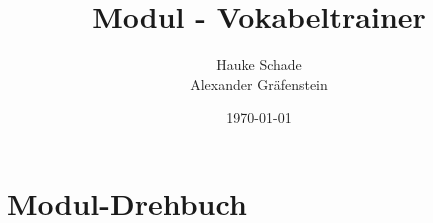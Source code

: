 \documentclass[a4paper]{scrartcl}
\title{Modul - Vokabeltrainer}
\author{Hauke Schade\\Alexander Gräfenstein}
\date{\today}
\begin{document}
	\maketitle
	\newpage

	

	\section{Modul-Drehbuch}
	
\end{document}
